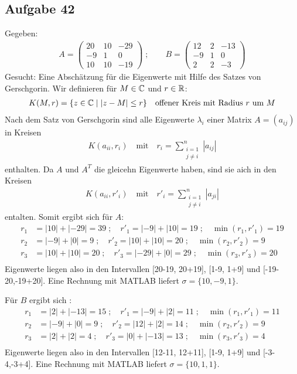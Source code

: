\subsection*{Aufgabe 42}

Gegeben:
\begin{align*}
  A = \begin{pmatrix}20&10&-29\\ -9&1&0\\ 10&10&-19\end{pmatrix}\; ;  \qquad
  B = \begin{pmatrix}12&2&-13\\ -9&1&0\\ 2&2&-3\end{pmatrix}
\end{align*}
Gesucht: Eine Abschätzung für die Eigenwerte mit Hilfe des Satzes von Gerschgorin.
Wir definieren für $M \in \mathbb C$ und $r \in \mathbb R$:
\begin{align*}
  K(M,r) = \{z\in \mathbb C \mid | z - M | \le r\} \quad \text{offener Kreis mit Radius $r$ um $M$}
\end{align*}
Nach dem Satz von Gerschgorin sind alle Eigenwerte $\lambda_i$ einer Matrix $A = (a_{ij})$
in Kreisen
\begin{align*}
  K(a_{ii}, r_i) \quad \text{mit} \quad r_i = \sum_{\substack{i = 1\\j \ne i}}^n |a_{ij} |
\end{align*}
enthalten. Da $A$ und $A^T$ die gleicehn Eigenwerte haben, sind sie aich in den Kreisen
\begin{align*}
  K(a_{ii}, r'_i) \quad \text{mit} \quad r'_i = \sum_{\substack{i = 1\\j \ne i}}^n |a_{ji} |
\end{align*}
entalten. Somit ergibt sich für $A$:
\begin{align*}
  r_1 &= |10| + |-29| = 39\;; \quad r'_1 = |-9| + |10| = 19\;; \quad\min(r_1, r'_1) = 19\\
  r_2 &= |-9| + |0| = 9\;; \quad r'_2 = |10| + |10| = 20\;; \quad \min(r_2, r'_2) = 9\\
  r_3 &= |10| + |10| = 20\;; \quad r'_3 = |-29| + |0| = 29\;; \quad \min(r_3, r'_3) = 20\\
\end{align*}
Eigenwerte liegen also in den Intervallen [20-19, 20+19], [1-9, 1+9] und [-19-20,-19+20].
Eine Rechnung mit MATLAB liefert $\sigma = \{10, -9, 1\}$.

Für $B$ ergibt sich :
\begin{align*}
  r_1 &= |2| + |-13| = 15\;; \quad r'_1 = |-9| + |2| = 11\;; \quad\min(r_1, r'_1) = 11\\
  r_2 &= |-9| + |0| = 9\;; \quad r'_2 = |12| + |2| = 14\;; \quad \min(r_2, r'_2) = 9\\
  r_3 &= |2| + |2| = 4\;; \quad r'_3 = |0| + |-13| = 13\;; \quad \min(r_3, r'_3) = 4\\
\end{align*}
Eigenwerte liegen also in den Intervallen [12-11, 12+11], [1-9, 1+9] und [-3-4,-3+4].
Eine Rechnung mit MATLAB liefert $\sigma = \{10, 1, 1\}$.

